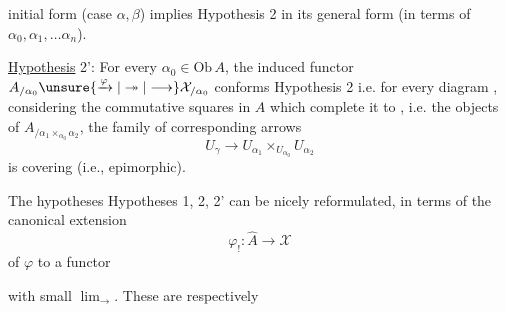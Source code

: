 
initial form (case $\alpha,\beta$) implies Hypothesis 2 in its general form (in terms of $\alpha_0,\alpha_1,\ldots\alpha_n$).

\uline{Hypothesis} 2': For every $\alpha_0\in\mathrm{Ob}\,A$, the induced functor $A_{/\alpha_0}\unsure{\xrightarrow{\varphi}|\twoheadrightarrow|\longrightarrow}\mathcal X_{/\alpha_0}$ conforms  Hypothesis 2 i.e. for every diagram
, considering the commutative squares in $A$ which complete it to
, i.e. the objects of $A_{/\alpha_1\times_{\alpha_0}\alpha_2}$, the family of corresponding arrows
\[U_\gamma\longrightarrow U_{\alpha_1}\times_{U_{\alpha_0}}U_{\alpha_2}\]
is covering (i.e., epimorphic).

The hypotheses Hypotheses 1, 2, 2' can be nicely reformulated, in terms of the canonical extension
\[\varphi_!:\widehat A\longrightarrow\mathcal X\]
of $\varphi$ to a functor   with small $\lim_{\longrightarrow}$. These are respectively
